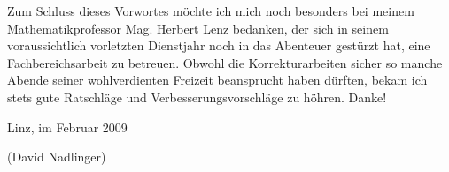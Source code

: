 Zum Schluss dieses Vorwortes möchte ich mich noch besonders bei meinem Mathematikprofessor Mag. Herbert Lenz bedanken, der sich in seinem voraussichtlich vorletzten Dienstjahr noch in das Abenteuer gestürzt hat, eine Fachbereichsarbeit zu betreuen. Obwohl die Korrekturarbeiten sicher so manche Abende seiner wohlverdienten Freizeit beansprucht haben dürften, bekam ich stets gute Ratschläge und Verbesserungsvorschläge zu höhren. Danke!

\vspace{0.8cm}
Linz, im Februar 2009

\vspace{0.6cm}
{\small(David Nadlinger)}